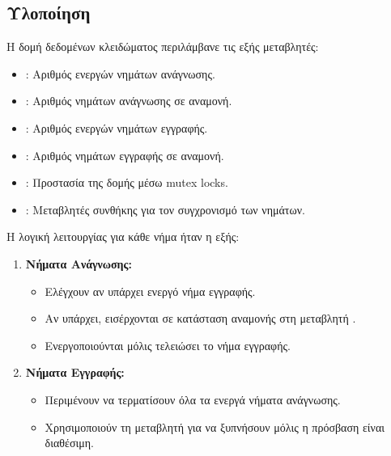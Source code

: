 \documentclass{article}
\begin{document}
\subsection*{Υλοποίηση} 
Η δομή δεδομένων κλειδώματος περιλάμβανε τις εξής μεταβλητές: 
\begin{itemize} 
    \item {}: Αριθμός ενεργών νημάτων ανάγνωσης. 
    \item {}: Αριθμός νημάτων ανάγνωσης σε αναμονή. 
    \item {}: Αριθμός ενεργών νημάτων εγγραφής. 
    \item {}: Αριθμός νημάτων εγγραφής σε αναμονή. 
    \item {}: Προστασία της δομής μέσω mutex locks. 
    \item {}: Μεταβλητές συνθήκης για τον συγχρονισμό των νημάτων. 
\end{itemize}
Η λογική λειτουργίας για κάθε νήμα ήταν η εξής: 
\begin{enumerate} 
    \item \textbf{Νήματα Ανάγνωσης:} 
    \begin{itemize} 
        \item Ελέγχουν αν υπάρχει ενεργό νήμα εγγραφής. 
        \item Αν υπάρχει, εισέρχονται σε κατάσταση αναμονής στη μεταβλητή . 
        \item Ενεργοποιούνται μόλις τελειώσει το νήμα εγγραφής. 
    \end{itemize} 
    \item \textbf{Νήματα Εγγραφής:} 
    \begin{itemize} 
        \item Περιμένουν να τερματίσουν όλα τα ενεργά νήματα ανάγνωσης. 
        \item Χρησιμοποιούν τη μεταβλητή  για να ξυπνήσουν μόλις η πρόσβαση είναι διαθέσιμη. 
    \end{itemize} 
\end{enumerate}
\end{document}
